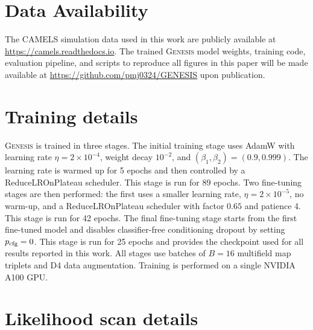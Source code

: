 \documentclass[usenatbib]{mnras}
\begin{document}
\section*{Data Availability}

The CAMELS simulation data used in this work are publicly available at
\url{https://camels.readthedocs.io}.
The trained \textsc{Genesis} model weights, training code, evaluation
pipeline, and scripts to reproduce all figures in this paper will be
made available at \url{https://github.com/pmj0324/GENESIS} upon
publication.




\appendix

\section{Training details}
\label{app:training_details}

\textsc{Genesis} is trained in three stages. The initial training stage
uses AdamW \citep{Loshchilov2019} with learning rate
$\eta=2\times10^{-4}$, weight decay $10^{-2}$, and
$(\beta_1,\beta_2)=(0.9,0.999)$. The learning rate is warmed up for
5 epochs and then controlled by a ReduceLROnPlateau scheduler. This
stage is run for 89 epochs. Two fine-tuning stages are then performed:
the first uses a smaller learning rate, $\eta=2\times10^{-5}$, no
warm-up, and a ReduceLROnPlateau scheduler with factor $0.65$ and
patience 4. This stage is run for 42 epochs. The final fine-tuning
stage starts from the first fine-tuned model and disables
classifier-free conditioning dropout by setting $p_{\rm cfg}=0$. This
stage is run for 25 epochs and provides the checkpoint used for all
results reported in this work. All stages use batches of $B=16$
multifield map triplets and D4 data augmentation. Training is performed
on a single NVIDIA A100 GPU.

\section{Likelihood scan details}
\label{app:likelihood_scan}
\end{document}
